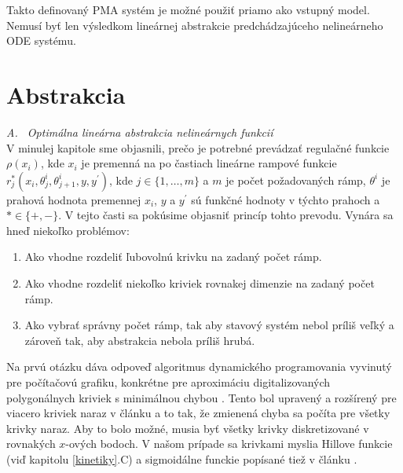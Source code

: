 \documentclass[11pt,final,oneside]{fithesis}
\begin{document}
Takto definovan\'y PMA syst\'em je mo\v zn\'e pou\v zi\v t priamo ako vstupn\'y model. Nemus\'i by\v t len v\'ysledkom line\'arnej 
abstrakcie predch\'adzaj\'uceho neline\'arneho ODE syst\'emu.
\cite{HIBI-2009}\cite{HIBI-2010}

\section{Abstrakcia}
\label{sec:abstraction}

\noindent
\textit{A. \ Optim\'alna line\'arna abstrakcia neline\'arnych funkci\'i}
\\

V minulej kapitole sme objasnili, pre\v co je potrebn\'e prev\'adza\v t regula\v cn\'e funkcie $\rho(x_i)$, kde $x_i$ je premenn\'a na po \v castiach line\'arne 
rampov\'e funkcie $r^*_j(x_i,\theta^i_j,\theta^i_{j+1},y,y^{'})$, kde $j \in \{1,\dots{},m\}$ a $m$ je po\v cet po\v zadovan\'ych r\'amp, $\theta^i$ je 
prahov\'a hodnota premennej $x_i$, $y$ a $y^{'}$ s\'u funk\v cn\'e hodnoty v t\'ychto prahoch a $* \in \{+,-\}$. 
V tejto \v casti sa pok\'usime objasni\v t princ\'ip tohto prevodu. Vyn\'ara sa hne\v d nieko\v lko probl\'emov:
\begin{enumerate}
\item Ako vhodne rozdeli\v t \v lubovoln\'u krivku na zadan\'y po\v cet r\'amp.
\item Ako vhodne rozdeli\v t nieko\v lko kriviek rovnakej dimenzie na zadan\'y po\v cet r\'amp.
\item Ako vybra\v t spr\'avny po\v cet r\'amp, tak aby stavov\'y syst\'em nebol pr\'ili\v s ve\v lk\'y a z\'arove\v n tak, aby abstrakcia nebola 
pr\'ili\v s hrub\'a.
\end{enumerate}
Na prv\'u ot\'azku d\'ava odpove\v d algoritmus dynamick\'eho programovania vyvinut\'y pre po\v c\'ita\v cov\'u grafiku, konkr\'etne pre aproxim\'aciu
digitalizovan\'ych polygon\'alnych kriviek s minim\'alnou chybou \cite{CURVES}. Tento bol upraven\'y a roz\v s\'iren\'y pre viacero kriviek naraz v 
\v cl\'anku \cite{CAV-2011} a to tak, \v ze zmienen\'a chyba sa po\v c\'ita pre
v\v setky krivky naraz. Aby to bolo mo\v zn\'e, musia by\v t v\v setky krivky diskretizovan\'e v rovnak\'ych $x$-ov\'ych bodoch. 
V na\v som pr\'ipade sa krivkami myslia Hillove funkcie (vi\v d kapitolu \ref{kinetiky}.C) a sigmoid\'alne funckie pop\'isan\'e tie\v z v \v cl\'anku \cite{CAV-2011}.
\end{document}
